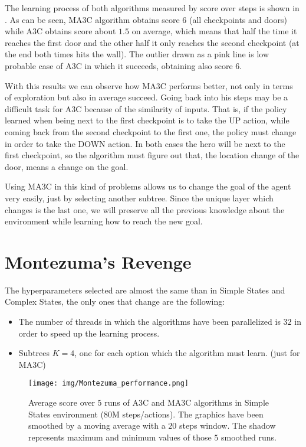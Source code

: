The learning process of both algorithms measured by score over steps is shown in .
As can be seen, \ac{MA3C} algorithm obtains score $6$ (all checkpoints and doors) while \ac{A3C} obtains score about $1.5$ on average,
which means that half the time it reaches the first door and the other half it only reaches the second checkpoint
(at the end both times hits the wall).
The outlier drawn as a pink line is low probable case of \ac{A3C} in which it succeeds, obtaining also score $6$.

With this results we can observe how \ac{MA3C} performs better, not only in terms of exploration but also in average succeed.
Going back into his steps may be a difficult task for \ac{A3C} because of the similarity of inputs.
That is, if the policy learned when being next to the first checkpoint is to take the \textsc{UP} action, while coming back
from the second checkpoint to the first one, the policy must change in order to take the \textsc{DOWN} action.
In both cases the hero will be next to the first checkpoint, so the algorithm must figure out that, the location change
of the door, means a change on the goal.

Using \ac{MA3C} in this kind of problems allows us to change the goal of the agent very easily, just by selecting another
subtree.
Since the unique layer which changes is the last one, we will preserve all the previous knowledge about the environment
while learning how to reach the new goal.


\section{Montezuma's Revenge}

The hyperparameters selected are almost the same than in Simple States and Complex States, the only ones that change are
the following:
\begin{itemize}
    \item The number of threads in which the algorithms have been parallelized is $32$ in order to speed up the learning
    process.
    \item Subtrees $K = 4$, one for each option which the algorithm must learn. (just for \ac{MA3C})
\end{itemize}

\begin{figure}[hbtp]
\begin{center}
\texttt{[image: img/Montezuma\_performance.png]}
\end{center}
\caption[Montezuma's Revenge performance]
{Average score over $5$ runs of \ac{A3C} and \ac{MA3C} algorithms in Simple States environment (80M steps/actions).
The graphics have been smoothed by a moving average with a $20$ steps window.
The shadow represents maximum and minimum values of those $5$ smoothed runs.}
\label{fig:Montezuma_performance}
\end{figure}

